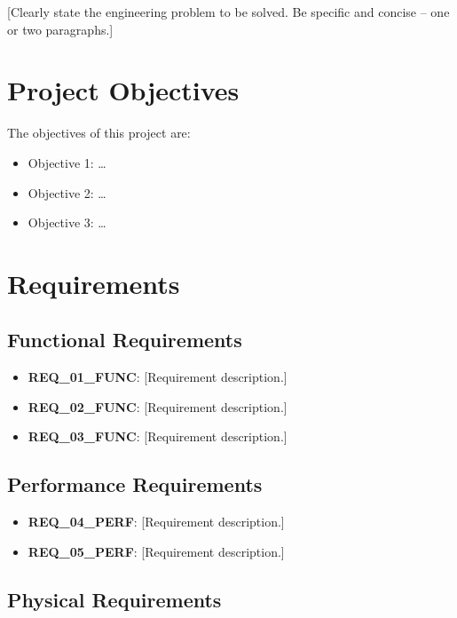 \documentclass[12pt, a4paper]{report}
\begin{document}
[Clearly state the engineering problem to be solved. Be specific and
concise – one or two paragraphs.]

\section{Project Objectives}
\label{sec:objectives}

The objectives of this project are:

\begin{itemize}
    \item Objective 1: \ldots
    \item Objective 2: \ldots
    \item Objective 3: \ldots
\end{itemize}

\section{Requirements}
\label{sec:requirements}

\subsection{Functional Requirements}
\label{subsec:func-req}

\begin{itemize}
    \item \textbf{REQ\_01\_FUNC}: [Requirement description.]
    \item \textbf{REQ\_02\_FUNC}: [Requirement description.]
    \item \textbf{REQ\_03\_FUNC}: [Requirement description.]
\end{itemize}

\subsection{Performance Requirements}
\label{subsec:perf-req}

\begin{itemize}
    \item \textbf{REQ\_04\_PERF}: [Requirement description.]
    \item \textbf{REQ\_05\_PERF}: [Requirement description.]
\end{itemize}

\subsection{Physical Requirements}
\label{subsec:phys-req}
\end{document}
